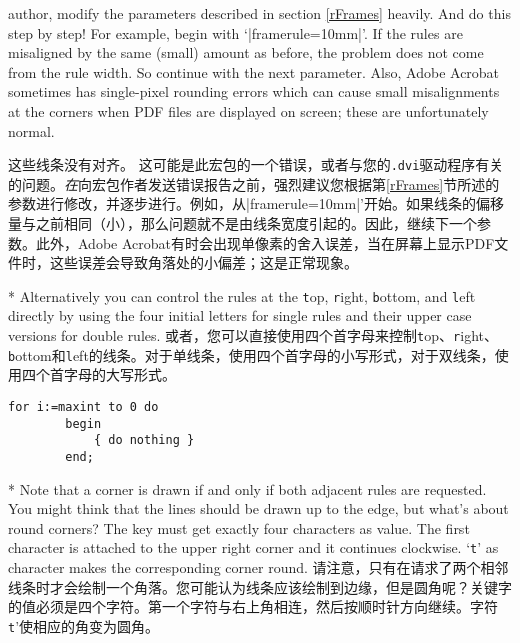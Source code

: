 \begin{paracol}{2}
\begin{advise}
     author, modify the parameters described in section \ref{rFrames}
     heavily. And do this step by step!
     For example, begin with `|framerule=10mm|'. If the rules are
     misaligned by the same (small) amount as before, the problem does not
     come from the rule width. So continue with the next parameter.  Also,
     Adobe Acrobat sometimes has single-pixel rounding errors which can
     cause small misalignments at the corners when PDF files are displayed
     on screen; these are unfortunately normal.
\end{advise}
\switchcolumn
\begin{advise}
    \item 这些线条没有对齐。
    \advisespace
    这可能是此宏包的一个错误，或者与您的\texttt{.dvi}驱动程序有关的问题。\emph{在}向宏包作者发送错误报告之前，强烈建议您根据第\ref{rFrames}节所述的参数进行修改，并逐步进行。例如，从|framerule=10mm|'开始。如果线条的偏移量与之前相同（小），那么问题就不是由线条宽度引起的。因此，继续下一个参数。此外，Adobe Acrobat有时会出现单像素的舍入误差，当在屏幕上显示PDF文件时，这些误差会导致角落处的小偏差；这是正常现象。 
\end{advise}
\switchcolumn[0]*%
Alternatively you can control the rules at the \texttt{t}op, \texttt{r}ight,
\texttt{b}ottom, and \texttt{l}eft directly by using the four initial letters
for single rules and their upper case versions for double rules.
\switchcolumn
或者，您可以直接使用四个首字母来控制\texttt{t}op、\texttt{r}ight、\texttt{b}ottom和\texttt{l}eft的线条。对于单线条，使用四个首字母的小写形式，对于双线条，使用四个首字母的大写形式。
\begin{lstsample}[frame]{}{}
        \begin{lstlisting}[frame=trBL]
        for i:=maxint to 0 do
        begin
            { do nothing }
        end;
        \end{lstlisting}
\end{lstsample}
\switchcolumn[0]*%
Note that a corner is drawn if and only if both adjacent rules are requested.
You might think that the lines should be drawn up to the edge, but what's
about round corners? The key  must get exactly four
characters as value. The first character is attached to the upper right
corner and it continues clockwise. `\texttt{t}' as character makes the
corresponding corner round.
\switchcolumn
请注意，只有在请求了两个相邻线条时才会绘制一个角落。您可能认为线条应该绘制到边缘，但是圆角呢？关键字的值必须是四个字符。第一个字符与右上角相连，然后按顺时针方向继续。字符\texttt{t}'使相应的角变为圆角。 

\end{paracol}
